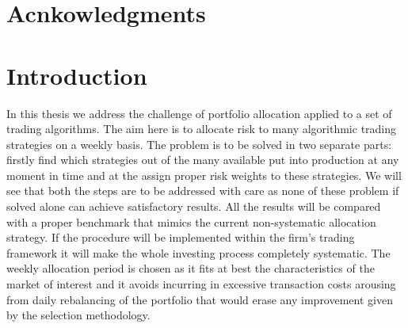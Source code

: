 \documentclass[12pt]{article} %
\numberwithin{equation}{subsection}
\begin{document}
\newpage
\tableofcontents

\newpage

\section*{Acnkowledgments}

\section{Introduction}\label{intro}

In this thesis we address the challenge of portfolio allocation applied to a set of trading algorithms. The aim here is to allocate risk to many algorithmic trading strategies on a weekly basis. The problem is to be solved in two separate parts: firstly find which strategies out of the many available put into production at any moment in time and at the assign proper risk weights to these strategies. We will see that both the steps are to be addressed with care as none of these problem if solved alone can achieve satisfactory results. All the results will be compared with a proper benchmark that mimics the current non-systematic allocation strategy. If the procedure will be implemented within the firm's trading framework it will make the whole investing process completely systematic. The weekly allocation period is chosen as it fits at best the characteristics of the market of interest and it avoids incurring in excessive transaction costs arousing from daily rebalancing of the portfolio that would erase any improvement given by the selection methodology.\\
\end{document}
